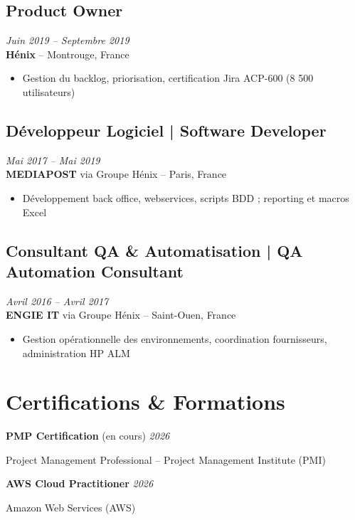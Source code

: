 \documentclass[11pt,a4paper]{article}
\begin{document}
\subsection*{Product Owner} \hfill \textit{Juin 2019 -- Septembre 2019}\\
\textbf{Hénix} -- Montrouge, France\\
\begin{itemize}
    \item Gestion du backlog, priorisation, certification Jira ACP-600 (8 500 utilisateurs)
\end{itemize}

\subsection*{Développeur Logiciel | Software Developer} \hfill \textit{Mai 2017 -- Mai 2019}\\
\textbf{MEDIAPOST} via Groupe Hénix -- Paris, France\\
\begin{itemize}
    \item Développement back office, webservices, scripts BDD ; reporting et macros Excel
\end{itemize}

\subsection*{Consultant QA \& Automatisation | QA Automation Consultant} \hfill \textit{Avril 2016 -- Avril 2017}\\
\textbf{ENGIE IT} via Groupe Hénix -- Saint-Ouen, France\\
\begin{itemize}
    \item Gestion opérationnelle des environnements, coordination fournisseurs, administration HP ALM
\end{itemize}

\section*{Certifications \& Formations}

\textbf{PMP Certification} (en cours) \hfill \textit{2026}

Project Management Professional -- Project Management Institute (PMI)

\textbf{AWS Cloud Practitioner} \hfill \textit{2026}

Amazon Web Services (AWS)
\end{document}
